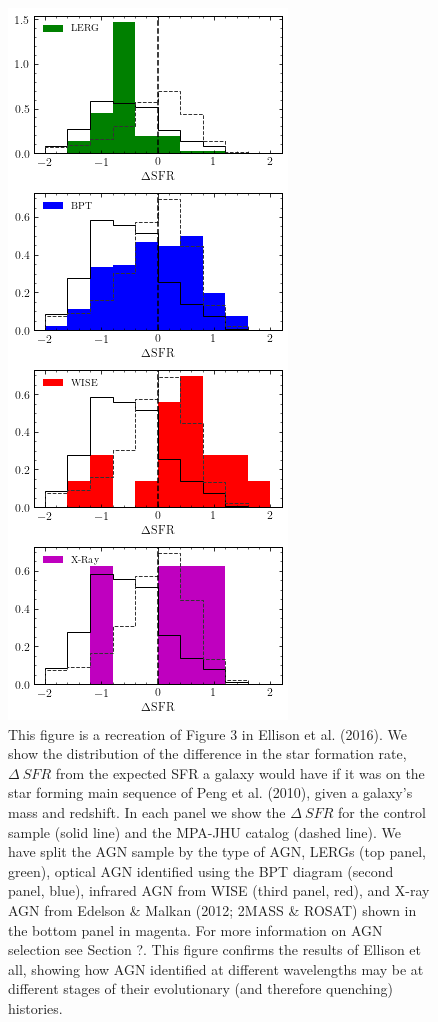 \documentclass[useAMS,usenatbib]{mn2e}
\begin{document}
\begin{figure}
\includegraphics[height=0.75\textheight]{../data/ellison/figures/manga_agn_recreate_ellison.png}
\caption{This figure is a recreation of Figure 3 in Ellison et al. (2016). We show the distribution of the difference in the star formation rate, $\Delta~SFR$ from the expected SFR a galaxy would have if it was on the star forming main sequence of Peng et al. (2010), given a galaxy's mass and redshift. In each panel we show the $\Delta~SFR$ for the control sample (solid line) and the MPA-JHU catalog (dashed line). We have split the AGN sample by the type of AGN, LERGs (top panel, green), optical AGN identified using the BPT diagram (second panel, blue), infrared AGN from WISE (third panel, red), and X-ray AGN from Edelson \& Malkan (2012; 2MASS \& ROSAT) shown in the bottom panel in magenta. For more information on AGN selection see Section ?. This figure confirms the results of Ellison et all, showing how AGN identified at different wavelengths may be at different stages of their evolutionary (and therefore quenching) histories.}
\end{figure}
\end{document}
